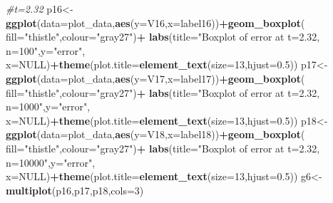 \documentclass[
]{article}
\newenvironment{Shaded}{\begin{snugshade}}{\end{snugshade}}
\newcommand{\CommentTok}[1]{\textcolor[rgb]{0.56,0.35,0.01}{\textit{#1}}}
\newcommand{\DataTypeTok}[1]{\textcolor[rgb]{0.13,0.29,0.53}{#1}}
\newcommand{\DecValTok}[1]{\textcolor[rgb]{0.00,0.00,0.81}{#1}}
\newcommand{\FloatTok}[1]{\textcolor[rgb]{0.00,0.00,0.81}{#1}}
\newcommand{\KeywordTok}[1]{\textcolor[rgb]{0.13,0.29,0.53}{\textbf{#1}}}
\newcommand{\NormalTok}[1]{#1}
\newcommand{\OperatorTok}[1]{\textcolor[rgb]{0.81,0.36,0.00}{\textbf{#1}}}
\newcommand{\OtherTok}[1]{\textcolor[rgb]{0.56,0.35,0.01}{#1}}
\newcommand{\StringTok}[1]{\textcolor[rgb]{0.31,0.60,0.02}{#1}}
\begin{document}
\begin{Shaded}
\begin{Highlighting}[]
\CommentTok{#t=2.32}
\NormalTok{p16<-}\KeywordTok{ggplot}\NormalTok{(}\DataTypeTok{data=}\NormalTok{plot_data,}\KeywordTok{aes}\NormalTok{(}\DataTypeTok{y=}\NormalTok{V16,}\DataTypeTok{x=}\NormalTok{label16))}\OperatorTok{+}\KeywordTok{geom_boxplot}\NormalTok{(}
  \DataTypeTok{fill=}\StringTok{"thistle"}\NormalTok{,}\DataTypeTok{colour=}\StringTok{"gray27"}\NormalTok{)}\OperatorTok{+}
\StringTok{  }\KeywordTok{labs}\NormalTok{(}\DataTypeTok{title=}\StringTok{"Boxplot of error at t=2.32, n=100"}\NormalTok{,}\DataTypeTok{y=}\StringTok{"error"}\NormalTok{,}
       \DataTypeTok{x=}\OtherTok{NULL}\NormalTok{)}\OperatorTok{+}\KeywordTok{theme}\NormalTok{(}\DataTypeTok{plot.title=}\KeywordTok{element_text}\NormalTok{(}\DataTypeTok{size=}\DecValTok{13}\NormalTok{,}\DataTypeTok{hjust=}\FloatTok{0.5}\NormalTok{))}
\NormalTok{p17<-}\KeywordTok{ggplot}\NormalTok{(}\DataTypeTok{data=}\NormalTok{plot_data,}\KeywordTok{aes}\NormalTok{(}\DataTypeTok{y=}\NormalTok{V17,}\DataTypeTok{x=}\NormalTok{label17))}\OperatorTok{+}\KeywordTok{geom_boxplot}\NormalTok{(}
  \DataTypeTok{fill=}\StringTok{"thistle"}\NormalTok{,}\DataTypeTok{colour=}\StringTok{"gray27"}\NormalTok{)}\OperatorTok{+}
\StringTok{  }\KeywordTok{labs}\NormalTok{(}\DataTypeTok{title=}\StringTok{"Boxplot of error at t=2.32, n=1000"}\NormalTok{,}\DataTypeTok{y=}\StringTok{"error"}\NormalTok{,}
       \DataTypeTok{x=}\OtherTok{NULL}\NormalTok{)}\OperatorTok{+}\KeywordTok{theme}\NormalTok{(}\DataTypeTok{plot.title=}\KeywordTok{element_text}\NormalTok{(}\DataTypeTok{size=}\DecValTok{13}\NormalTok{,}\DataTypeTok{hjust=}\FloatTok{0.5}\NormalTok{))}
\NormalTok{p18<-}\KeywordTok{ggplot}\NormalTok{(}\DataTypeTok{data=}\NormalTok{plot_data,}\KeywordTok{aes}\NormalTok{(}\DataTypeTok{y=}\NormalTok{V18,}\DataTypeTok{x=}\NormalTok{label18))}\OperatorTok{+}\KeywordTok{geom_boxplot}\NormalTok{(}
  \DataTypeTok{fill=}\StringTok{"thistle"}\NormalTok{,}\DataTypeTok{colour=}\StringTok{"gray27"}\NormalTok{)}\OperatorTok{+}
\StringTok{  }\KeywordTok{labs}\NormalTok{(}\DataTypeTok{title=}\StringTok{"Boxplot of error at t=2.32, n=10000"}\NormalTok{,}\DataTypeTok{y=}\StringTok{"error"}\NormalTok{,}
       \DataTypeTok{x=}\OtherTok{NULL}\NormalTok{)}\OperatorTok{+}\KeywordTok{theme}\NormalTok{(}\DataTypeTok{plot.title=}\KeywordTok{element_text}\NormalTok{(}\DataTypeTok{size=}\DecValTok{13}\NormalTok{,}\DataTypeTok{hjust=}\FloatTok{0.5}\NormalTok{))}
\NormalTok{g6<-}\KeywordTok{multiplot}\NormalTok{(p16,p17,p18,}\DataTypeTok{cols=}\DecValTok{3}\NormalTok{)}


\end{Highlighting}
\end{Shaded}
\end{document}
